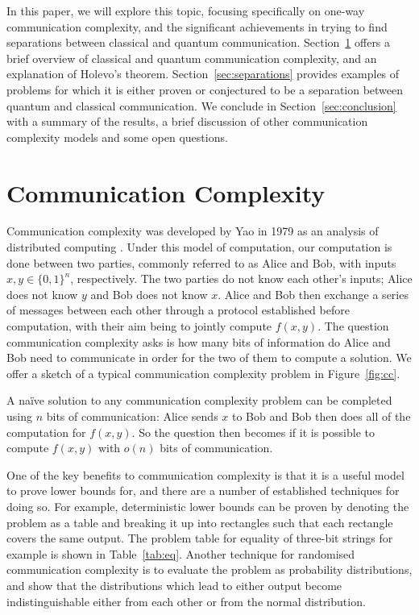 \documentclass[a4paper]{article}
\begin{document}
        In this paper, we will explore this topic, focusing specifically on one-way communication complexity, and the significant achievements in trying to find separations between classical and quantum communication. Section~\ref{sec:cc} offers a brief overview of classical and quantum communication complexity, and an explanation of Holevo's theorem. Section~\ref{sec:separations} provides examples of problems for which it is either proven or conjectured to be a separation between quantum and classical communication. We conclude in Section~\ref{sec:conclusion} with a summary of the results, a brief discussion of other communication complexity models and some open questions.

    \section{Communication Complexity}
    \label{sec:cc}

        Communication complexity was developed by Yao in 1979 as an analysis of distributed computing \cite{Yao:1979:CQR:800135.804414}. Under this model of computation, our computation is done between two parties, commonly referred to as Alice and Bob, with inputs $x, y \in \{0, 1\}^n$, respectively. The two parties do not know each other's inputs; Alice does not know $y$ and Bob does not know $x$. Alice and Bob then exchange a series of messages between each other through a protocol established before computation, with their aim being to jointly compute $f(x, y)$. The question communication complexity asks is how many bits of information do Alice and Bob need to communicate in order for the two of them to compute a solution. We offer a sketch of a typical communication complexity problem in Figure~\ref{fig:cc}.

        A na\"{i}ve solution to any communication complexity problem can be completed using $n$ bits of communication: Alice sends $x$ to Bob and Bob then does all of the computation for $f(x, y)$. So the question then becomes if it is possible to compute $f(x, y)$ with $o(n)$ bits of communication.

        One of the key benefits to communication complexity is that it is a useful model to prove lower bounds for, and there are a number of established techniques for doing so. For example, deterministic lower bounds can be proven by denoting the problem as a table and breaking it up into rectangles such that each rectangle covers the same output. The problem table for equality of three-bit strings for example is shown in Table~\ref{tab:eq}. Another technique for randomised communication complexity is to evaluate the problem as probability distributions, and show that the distributions which lead to either output become indistinguishable either from each other or from the normal distribution.
\end{document}
